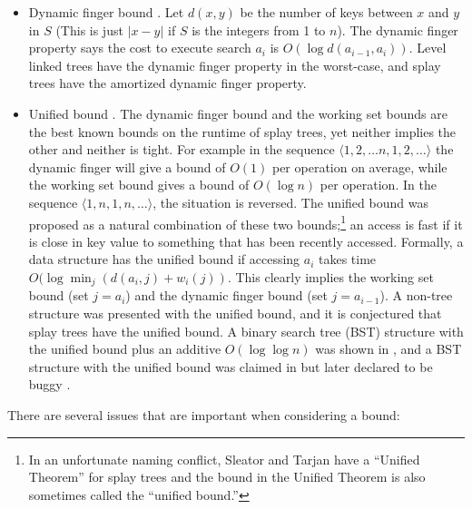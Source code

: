\documentclass{llncs}
\begin{document}
\begin{itemize}
\item Dynamic finger bound \cite{DBLP:journals/siamcomp/ColeMSS00,DBLP:journals/siamcomp/Cole00}. Let $d(x,y)$ be the number of keys between $x$ and $y$ in $S$ (This is just $|x-y|$ if $S$ is the integers from 1 to $n$). The dynamic finger property says the cost to execute search $a_i$ is $O(\log d(a_{i-1},a_i))$. Level linked trees \cite{DBLP:journals/iandc/HoffmanMRT86} have the dynamic finger property in the worst-case, and splay trees have the amortized dynamic finger property.

\item Unified bound \cite{DBLP:journals/tcs/BadoiuCDI07}. The dynamic finger bound and the working set bounds are the best known bounds on the runtime of splay trees, yet neither implies the other and neither is tight. For example in the sequence $\langle 1,2,\ldots n, 1,2, \ldots \rangle$ the dynamic finger will give a bound of $O(1)$ per operation on average, while the working set bound gives a bound of $O(\log n)$ per operation. In the sequence $\langle 1,n,1,n,\ldots \rangle$, the situation is reversed. 
The unified bound was proposed as a natural combination of these two bounds;\footnote{In an unfortunate naming conflict, Sleator and Tarjan have a ``Unified Theorem'' for splay trees \cite[Theorem~5]{DBLP:journals/jacm/SleatorT85} and the bound in the Unified Theorem is also sometimes called the ``unified bound.''} 
an access is fast if it is close in key value to something that has been recently accessed. Formally, a data structure has the unified bound if accessing $a_i$ takes time $O(\log \min_j ( d(a_i,j)+w_i(j))$. This clearly implies the working set bound (set $j=a_i$) and the dynamic finger bound (set $j=a_{i-1}$). A non-tree structure was presented with the unified bound, and it is conjectured that splay trees have the unified bound. A binary search tree (BST) structure with the unified bound plus an additive $O(\log \log n)$ was shown in \cite{DBLP:conf/wads/DerryberryS09}, and a BST structure with the unified bound was claimed in \cite{dthesis} but later declared to be buggy \cite{wrong}.

\end{itemize}

\noindent
There are several issues that are important when considering a bound:
\end{document}
